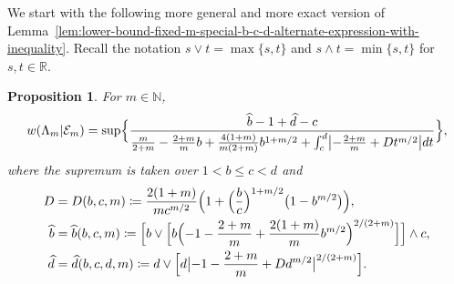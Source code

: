 \documentclass[a4paper]{amsart} %
\newtheorem{proposition}[theorem]{Proposition} %
\theoremstyle{definition}
\theoremstyle{remark}
\numberwithin{equation}{section}
\newcommand*{\RR}{\mathbb{R}}
\newcommand*{\NNone}{\mathbb{N}}
\newcommand*{\weakconstrestricted}[2]{w(#1|#2)} %
\newcommand*{\fclass}[1]{\mathcal{E}_{#1}}
\newcommand*{\dOne}{D}%
\newcommand*{\bGain}{\widehat{b}}
\newcommand*{\dGain}{\widehat{d}}
\begin{document}
We start with the following more general and more exact version of Lemma~\ref{lem:lower-bound-fixed-m-special-b-c-d-alternate-expression-with-inequality}.
Recall the notation $s\lor t = \max\{s, t\}$ and $s \land t = \min\{s, t\}$ for $s,t\in\RR$.


\begin{proposition}
	\label{prop:lower-bound-fixed-m}
	For $m\in\NNone$,
	\begin{equation*}
	\weakconstrestricted{\Lambda_m}{\fclass{m}} 
	=
	\sup\Bigl\{
	\frac{\bGain-1 + \dGain-c}{ \frac{m}{2+m} - \frac{2+m}{m}b + \frac{4(1+m)}{m(2+m)} b^{1+m/2} + \int_c^d \bigl|-\frac{2+m}{m} + \dOne t^{m/2} \bigr| dt}
	\Bigr\},
	\end{equation*}
	where the supremum is taken over  $1<b\leq c <d$ and  
	\begin{align*}
	\dOne &= \dOne(b,c,m) \coloneqq \frac{2(1+m)}{m c^{m/2}} \Bigl(1 + \Bigl(\frac{b}{c}\Bigr)^{1+m/2}\bigl(1 - b^{m/2}\bigr)\Bigr),\\
	\bGain &=\bGain(b,c,m)
	\coloneqq \Bigl[ b\lor \Bigl[ b\Bigl(-1 -\frac{2+m}{m} + \frac{2(1+m)}{m} b ^{m/2} \Bigr)^{2/(2+m)}\Bigr]\Bigr] \land c,\\
	\dGain &=\dGain(b,c,d,m)
	\coloneqq d\lor \Bigl[ d \bigl| - 1 - \frac{2+m}{m} + D d ^{m/2} \bigr|^{2/(2+m)}\Bigr].
	\end{align*}
\end{proposition}
\end{document}
